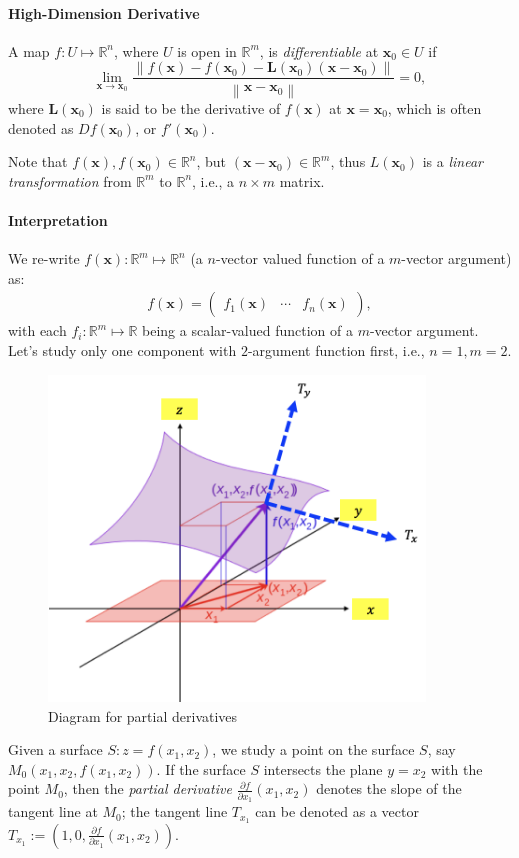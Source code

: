 \paragraph{High-Dimension Derivative}
\begin{definition}[Differentiable]
A map $f:U\mapsto\mathbb{R}^n$, where $U$ is open in $\mathbb{R}^m$, is \emph{differentiable} at $\bm x_0\in U$ if
\begin{equation}
\lim_{\bm x\to\bm x_0}
\frac{
\left\|
f(\bm x) - f(\bm x_0) - \bm L(\bm x_0)(\bm x-\bm x_0)
\right\|
}{
\left\|
\bm x-\bm x_0
\right\|
}=0,
\end{equation}
where $\bm L(\bm x_0)$ is said to be the derivative of $f(\bm x)$ at $\bm x=\bm x_0$, which is often denoted as $Df(\bm x_0)$, or $f'(\bm x_0)$.
\end{definition}
\begin{remark}
Note that $f(\bm x),f(\bm x_0)\in\mathbb{R}^n$, but $(\bm x-\bm x_0)\in\mathbb{R}^m$, thus $L(\bm x_0)$ is a \emph{linear transformation} from $\mathbb{R}^m$ to $\mathbb{R}^n$, i.e., a $n\times m$ matrix. 
\end{remark}
\paragraph{Interpretation}
We re-write $f(\bm x): \mathbb{R}^m\mapsto\mathbb{R}^n$ (a $n$-vector valued function of a $m$-vector argument) as:
\[
\begin{array}{l}
f(\bm x)=\begin{pmatrix}
f_1(\bm x)&\cdots&f_n(\bm x)
\end{pmatrix},
\end{array}
\]
with each $f_i:\mathbb{R}^m\mapsto\mathbb{R}$ being a scalar-valued function of a $m$-vector argument. Let's study only one component with $2$-argument function first, i.e., $n=1,m=2$. 
\begin{figure}[H]
\centering
\includegraphics[width=10cm]{week9/f_9_1}
\caption{Diagram for partial derivatives}
\end{figure}
Given a surface $S:z=f(x_1,x_2)$, we study a point on the surface $S$, say $M_0(x_1,x_2,f(x_1,x_2))$. If the surface $S$ intersects the plane $y=x_2$  with the point $M_0$, then the \emph{partial derivative} $\frac{\partial f}{\partial{x_1}}(x_1,x_2)$ denotes the slope of the tangent line at $M_0$; the tangent line $T_{x_1}$ can be denoted as a vector $T_{x_1}:=(1,0,\frac{\partial f}{\partial{x_1}}(x_1,x_2))$. 

